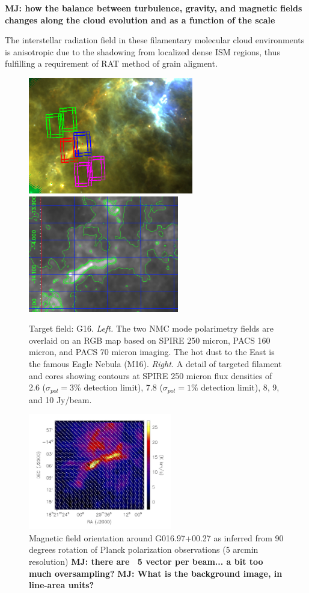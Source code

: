 \documentclass[11pt]{amsart}
\begin{document}
{{\bf MJ: how the balance between turbulence, gravity, and magnetic fields changes along the cloud evolution and as a function of the scale}

The interstellar radiation field in these filamentary molecular cloud environments is anisotropic due to the shadowing from localized dense ISM regions, thus fulfilling a requirement of  RAT method of grain aligment.

\begin{figure}
\includegraphics[height=2in]{g16_nmc.png}
\includegraphics[height=2in]{g16_c3a.png}
\caption{Target field: G16. {\it Left.}  The two NMC mode polarimetry fields are overlaid on an RGB map based on SPIRE 250 micron, PACS 160 micron, and PACS 70 micron imaging.  The hot dust to the East is the famous Eagle Nebula (M16).  {\it Right.} A detail of targeted filament and cores showing contours at SPIRE 250 micron flux densities of 2.6 ($\sigma_{pol} = 3\%$ detection limit), 7.8 ($\sigma_{pol} = 1\%$ detection limit), 8, 9, and 10 Jy/beam. 
\label{fig:fields}}
\end{figure}



\begin{figure}[h]
\includegraphics[height=2in]{g16_planckpol.jpg}
\caption{Magnetic field orientation around G016.97+00.27 as inferred from 90 degrees rotation of Planck polarization observations (5 arcmin resolution)
{\bf MJ: there are ~5 vector per beam... a bit too much oversampling?}
{\bf MJ: What is the background image, in line-area units?}
\label{fig:planckpol}}
\end{figure}


}
\end{document}
